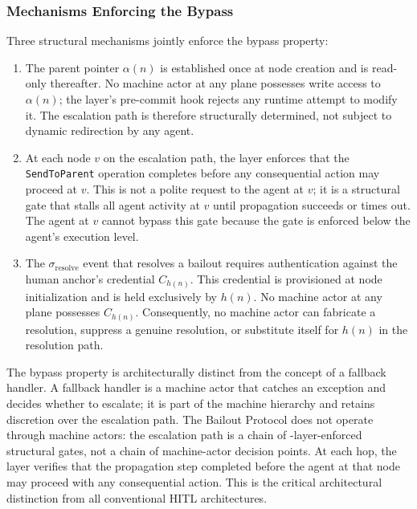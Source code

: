 \subsubsection*{Mechanisms Enforcing the Bypass}

Three structural mechanisms jointly enforce the bypass property:

\begin{enumerate}\itemsep=0pt
\item[$\textbf{Immutable parent pointer.}$] The parent pointer $\alpha(n)$ is established once at node creation and is read-only thereafter. No machine actor at any plane possesses write access to $\alpha(n)$; the \fact{} layer's pre-commit hook rejects any runtime attempt to modify it. The escalation path is therefore structurally determined, not subject to dynamic redirection by any agent.

\item[$\textbf{Pre-commit enforcement at each hop.}$] At each node $v$ on the escalation path, the \fact{} layer enforces that the \texttt{SendToParent} operation completes before any consequential action may proceed at $v$. This is not a polite request to the agent at $v$; it is a structural gate that stalls all agent activity at $v$ until propagation succeeds or times out. The agent at $v$ cannot bypass this gate because the gate is enforced below the agent's execution level.

\item[$\textbf{Credential binding on $\sigma_{\text{resolve}}$.}$] The $\sigma_{\text{resolve}}$ event that resolves a bailout requires authentication against the human anchor's credential $C_{h(n)}$. This credential is provisioned at node initialization and is held exclusively by $h(n)$. No machine actor at any plane possesses $C_{h(n)}$. Consequently, no machine actor can fabricate a resolution, suppress a genuine resolution, or substitute itself for $h(n)$ in the resolution path.
\end{enumerate}

The bypass property is architecturally distinct from the concept of a fallback handler. A fallback handler is a machine actor that catches an exception and decides whether to escalate; it is part of the machine hierarchy and retains discretion over the escalation path. The Bailout Protocol does not operate through machine actors: the escalation path is a chain of \fact{}-layer-enforced structural gates, not a chain of machine-actor decision points. At each hop, the \fact{} layer verifies that the propagation step completed before the agent at that node may proceed with any consequential action. This is the critical architectural distinction from all conventional HITL architectures.

